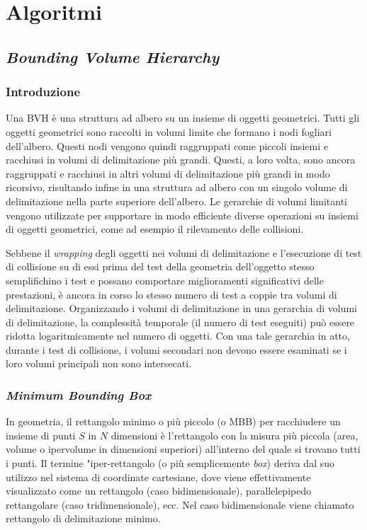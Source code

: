 \chapter{Algoritmi}
\label{Geom_Algos}
%
\section{\textit{Bounding Volume Hierarchy}}
%
\subsection{Introduzione}
Una \ac{BVH} è una struttura ad albero su un insieme di oggetti geometrici. Tutti gli oggetti geometrici sono raccolti in volumi limite che formano i nodi fogliari dell'albero. Questi nodi vengono quindi raggruppati come piccoli insiemi e racchiusi in volumi di delimitazione più grandi. Questi, a loro volta, sono ancora raggruppati e racchiusi in altri volumi di delimitazione più grandi in modo ricorsivo, risultando infine in una struttura ad albero con un singolo volume di delimitazione nella parte superiore dell'albero. Le gerarchie di volumi limitanti vengono utilizzate per supportare in modo efficiente diverse operazioni su insiemi di oggetti geometrici, come ad esempio il rilevamento delle collisioni.

Sebbene il \textit{wrapping} degli oggetti nei volumi di delimitazione e l'esecuzione di test di collisione su di essi prima del test della geometria dell'oggetto stesso semplifichino i test e possano comportare miglioramenti significativi delle prestazioni, è ancora in corso lo stesso numero di test a coppie tra volumi di delimitazione. Organizzando i volumi di delimitazione in una gerarchia di volumi di delimitazione, la complessità temporale (il numero di test eseguiti) può essere ridotta logaritmicamente nel numero di oggetti. Con una tale gerarchia in atto, durante i test di collisione, i volumi secondari non devono essere esaminati se i loro volumi principali non sono intersecati.
%
\subsection{\textit{Minimum Bounding Box}}
In geometria, il rettangolo minimo o più piccolo (o \ac{MBB}) per racchiudere un insieme di punti $S$ in $N$ dimensioni è l'rettangolo con la misura più piccola (area, volume o ipervolume in dimensioni superiori) all'interno del quale si trovano tutti i punti.  Il termine "iper-rettangolo (o più semplicemente \textit{box}) deriva dal suo utilizzo nel sistema di coordinate cartesiane, dove viene effettivamente visualizzato come un rettangolo (caso bidimensionale), parallelepipedo rettangolare (caso tridimensionale), ecc. Nel caso bidimensionale viene chiamato rettangolo di delimitazione minimo.
%
